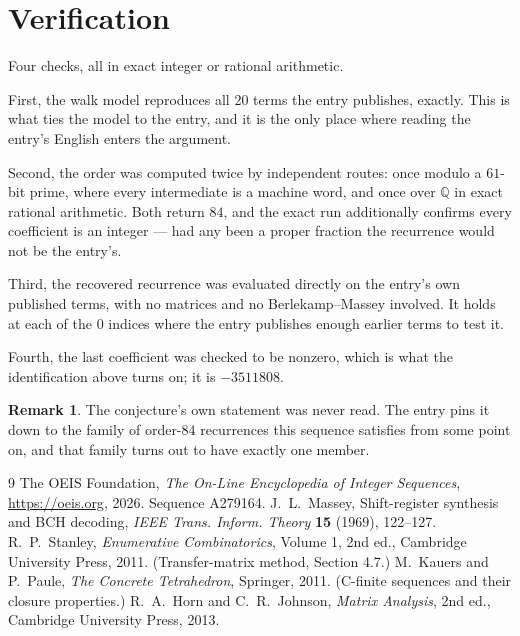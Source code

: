 \documentclass[11pt,a4paper]{article}
\theoremstyle{plain}
\theoremstyle{definition}
\newtheorem{remark}[theorem]{Remark}
\begin{document}
\section{Verification}

Four checks, all in exact integer or rational arithmetic.

First, the walk model reproduces all $20$ terms the entry publishes, exactly. This is
what ties the model to the entry, and it is the only place where reading the entry's English
enters the argument.

Second, the order was computed twice by independent routes: once modulo a $61$-bit prime, where
every intermediate is a machine word, and once over $\mathbb{Q}$ in exact rational arithmetic.
Both return $84$, and the exact run additionally confirms every coefficient is an integer
--- had any been a proper fraction the recurrence would not be the entry's.

Third, the recovered recurrence was evaluated directly on the entry's own published terms, with
no matrices and no Berlekamp--Massey involved. It holds at each of the $0$ indices where
the entry publishes enough earlier terms to test it.

Fourth, the last coefficient was checked to be nonzero, which is what the identification above
turns on; it is $-3511808$.

\begin{remark}
The conjecture's own statement was never read. The entry pins it down to the family of
order-$84$ recurrences this sequence satisfies from some point on, and that family turns
out to have exactly one member.
\end{remark}

\begin{thebibliography}{9}
 The OEIS Foundation, \emph{The On-Line Encyclopedia of Integer
Sequences}, \url{https://oeis.org}, 2026. Sequence A279164.
 J.~L.~Massey, Shift-register synthesis and BCH decoding, \emph{IEEE
Trans. Inform. Theory} \textbf{15} (1969), 122--127.
 R.~P.~Stanley, \emph{Enumerative Combinatorics}, Volume 1, 2nd ed.,
Cambridge University Press, 2011. (Transfer-matrix method, Section 4.7.)
 M.~Kauers and P.~Paule, \emph{The Concrete Tetrahedron}, Springer, 2011.
(C-finite sequences and their closure properties.)
 R.~A.~Horn and C.~R.~Johnson, \emph{Matrix Analysis}, 2nd ed., Cambridge
University Press, 2013.
\end{thebibliography}
\end{document}
